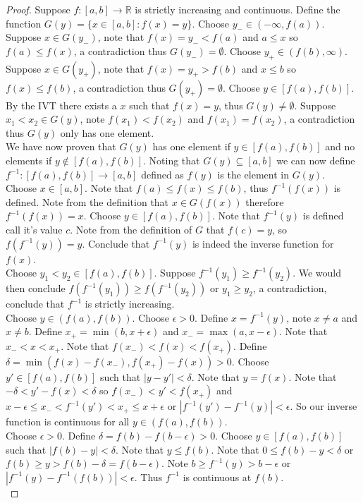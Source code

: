 \documentclass[12pt]{article}
\theoremstyle{homework}
\begin{document}
\begin{proof}
Suppose $f : [a, b] \rightarrow \mathbb{R}$ is strictly increasing and continuous.  Define the function $G(y)=\{x\in[a, b] :f(x)=y \}$.  Choose $y_-\in (-\infty,f(a))$.  Suppose $x\in G(y_-)$, note that $f(x)=y_-<f(a)$ and $a\leq x$ so $f(a)\leq f(x)$, a contradiction thus $G(y_-)=\emptyset$.  Choose $y_+\in (f(b),\infty)$.  Suppose $x\in G(y_+)$, note that $f(x)=y_+>f(b)$ and $x\leq b$ so $f(x)\leq f(b)$, a contradiction thus $G(y_+)=\emptyset$.  Choose $y\in [f(a),f(b)]$.  By the IVT there exists a $x$ such that $f(x)=y$, thus $G(y)\neq \emptyset$.  Suppose $x_1<x_2\in G(y)$, note $f(x_1)<f(x_2)$ and $f(x_1)=f(x_2)$, a contradiction thus $G(y)$ only has one element.\\
We have now proven that $G(y)$ has one element if $y\in[f(a), f(b)]$ and no elements if $y\not\in[f(a), f(b)]$.  Noting that $G(y)\subseteq[a, b] $ we can now define $f^{-1}:[f(a), f(b)]\rightarrow [a, b]$ defined as $f(y)$ is the element in $G(y)$.\\
Choose $x\in [a,b]$.  Note that $f(a)\leq f(x)\leq f(b)$, thus $f^{-1}(f(x))$ is defined.  Note from the definition that $x\in G(f(x))$ therefore $f^{-1}(f(x))=x$.  Choose $y\in[f(a), f(b)]$.  Note that $f^{-1}(y)$ is defined call it's value $c$. Note from the definition of $G$ that $f(c)=y$, so $f(f^{-1}(y))=y$.  Conclude that $f^{-1}(y)$ is indeed the inverse function for $f(x)$.\\
Choose $y_1<y_2\in[f(a), f(b)]$.  Suppose $f^{-1}(y_1)\geq f^{-1}(y_2)$.  We would then conclude $f(f^{-1}(y_1))\geq f(f^{-1}(y_2))$ or $y_1\geq y_2$, a contradiction, conclude that $f^{-1}$ is strictly increasing.\\
Choose $y\in (f(a), f(b))$.  Choose $\epsilon>0$.  Define $x=f^{-1}(y)$, note $x\neq a$ and $x\neq b$.  Define $x_+=\min(b,x+\epsilon)$ and $x_-=\max(a,x-\epsilon)$.  Note that $x_-<x<x_+$.  Note that $f(x_-)<f(x)<f(x_+)$.  Define $\delta=\min(f(x)-f(x_-),f(x_+)-f(x))>0$.  Choose $y'\in [f(a), f(b)]$ such that $|y-y'|<\delta$.  Note that $y=f(x)$.  Note that $-\delta<y'-f(x)<\delta$ so $f(x_-)<y'<f(x_+)$ and $x-\epsilon\leq x_-<f^{-1}(y')<x_+\leq x+\epsilon$ or $|f^{-1}(y')-f^{-1}(y)|<\epsilon$.  So our inverse function is continuous for all $y\in (f(a), f(b))$.\\
Choose $\epsilon>0$.  Define $\delta=f(b)-f(b-\epsilon)>0$.  Choose $y\in [f(a), f(b)]$ such that $|f(b)-y|<\delta$.  Note that $y\leq f(b)$.  Note that $0 \leq f(b)-y<\delta$ or $f(b) \geq y>f(b)-\delta=f(b-\epsilon)$.  Note $b \geq f^{-1}(y)>b-\epsilon$ or $|f^{-1}(y)-f^{-1}(f(b))|<\epsilon$.  Thus $f^{-1}$ is continuous at $f(b)$.\\

\end{proof}
\end{document}
